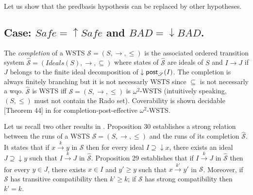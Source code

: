Let us show that the predbasis hypothesis can be replaced by other hypotheses.

\subsection{Case: $Safe=\uparrow Safe$ and $BAD=\downarrow BAD$.}

%
%




The \emph{completion}  \cite{BFM-ic17} of a WSTS $\mathscr{S}=(S,\rightarrow, \leq)$ is the associated ordered transition system $\hat{\mathscr{S}}=(Ideals(S),\rightarrow, \subseteq)$ where states of $\hat{\mathscr{S}}$ are ideals of $S$ and $I \rightarrow J$ if $J$ belongs to the finite ideal decomposition of $\downarrow \textsf{post}_{\mathscr{S}}(I)$. The completion is always finitely branching but it is not necessarly WSTS since $\subseteq$ is not necessarly a wqo. $\hat{\mathscr{S}}$ is WSTS iff $\mathscr{S}=(S,\rightarrow, \leq)$ is $\omega^2$-WSTS (intuitively speaking, $(S,\leq)$ must not contain the Rado set). Coverability is shown decidable  [Theorem 44] in \cite{BFM-ic17} for completion-post-effective $\omega^2$-WSTS.

Let us recall two other results in \cite{BFM-ic17}. Proposition 30 establishes a strong relation between the runs of a WSTS $\mathscr{S}=(S,\rightarrow, \leq)$ and the runs of its completion $\hat{\mathscr{S}}$. It states that if $x \xrightarrow{k} y$ in $\mathscr{S}$ then for every ideal $I \supseteq \downarrow x$, there exists an ideal $J \supseteq \downarrow y$ such that $I \xrightarrow{k} J$ in $\hat{\mathscr{S}}$. Proposition 29 establishes that if $I \xrightarrow{k} J$ in $\hat{\mathscr{S}}$ then for every $y \in J$, there exists $x \in I$ and $y' \geq y$ such that $x \xrightarrow{k'} y'$ in $\mathscr{S}$. Moreover, if $\mathscr{S}$ has transitive compatibility then $k’ \geq k$; if $\mathscr{S}$ has strong compatibility then $k’ = k$.


